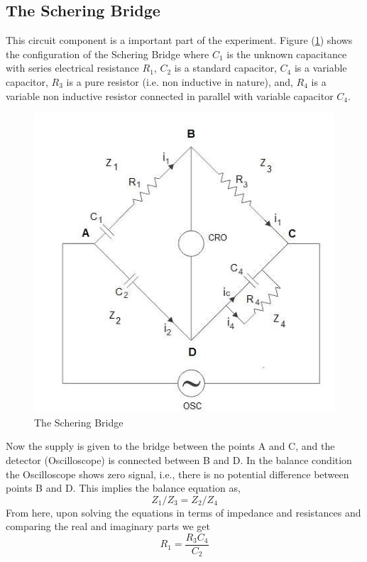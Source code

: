 \documentclass[%
 aip,
 amsmath,amssymb,
 reprint, floatfix%
]{revtex4-1}
\begin{document}
    \subsection{The Schering Bridge}
    This circuit component is a important part of the experiment. Figure (\ref{fig:schering2}) shows the configuration of the Schering Bridge where $C_1$ is the unknown capacitance with series electrical resistance $R_1$, $C_2$ is a standard capacitor, $C_4$ is a variable capacitor, $R_3$ is a pure resistor (i.e. non inductive in nature), and, $R_4$ is a variable non inductive resistor connected in parallel with variable capacitor $C_4$.
    \begin{figure}
        \centering
        \includegraphics[scale = 0.95]{Figures/schering.png}
        \caption{The Schering Bridge}
        \label{fig:schering2}
    \end{figure}
    Now the supply is given to the bridge between the points A and C, and the detector (Oscilloscope) is connected between B and D. In the balance condition the Oscilloscope shows zero signal, i.e., there is no potential difference between points B and D. This implies the balance equation as,
    \begin{equation}
        Z_1/Z_3 = Z_2/Z_4
    \end{equation}
    From here, upon solving the equations in terms of impedance and resistances and comparing the real and imaginary parts we get
    \begin{equation}
        R_1 = \dfrac{R_3 C_4}{C_2}
    \end{equation}
\end{document}
